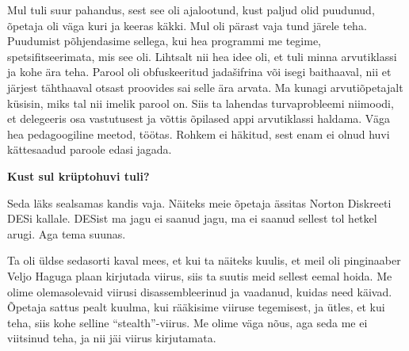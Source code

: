 Mul tuli suur pahandus, sest see oli ajalootund, kust
paljud olid puudunud, õpetaja oli väga kuri ja keeras käkki. Mul oli
pärast vaja tund järele teha. Puudumist põhjendasime sellega, kui 
hea programmi me tegime, spetsifitseerimata, mis see oli. Lihtsalt nii hea idee oli, et
tuli minna arvutiklassi ja kohe ära teha. Parool oli obfuskeeritud
jadašifrina või isegi baithaaval, nii et järjest tähthaaval otsast proovides
sai selle ära arvata. Ma kunagi arvutiõpetajalt küsisin, miks
tal nii imelik parool on. Siis ta lahendas turvaprobleemi niimoodi, et
delegeeris osa vastutusest ja võttis õpilased appi arvutiklassi
haldama. Väga hea pedagoogiline meetod, töötas. Rohkem ei häkitud, sest enam ei olnud 
huvi kättesaadud paroole edasi jagada.

\textbf{Kust sul krüptohuvi tuli?}

Seda läks sealsamas kandis vaja. Näiteks meie õpetaja ässitas Norton
Diskreeti
DESi kallale. DESist
ma jagu ei saanud jagu, ma ei saanud sellest tol hetkel arugi. Aga tema suunas. 

Ta oli üldse sedasorti kaval mees, et kui ta näiteks kuulis, et meil oli
pinginaaber Veljo Haguga plaan kirjutada viirus,
siis ta suutis meid sellest eemal hoida. Me olime olemasolevaid viirusi
disassembleerinud ja vaadanud, kuidas need käivad. Õpetaja sattus pealt kuulma,
kui rääkisime viiruse tegemisest, ja ütles, et kui teha, siis kohe
selline \enquote{stealth}-viirus. Me olime väga nõus, aga seda me ei viitsinud
teha, ja nii jäi viirus kirjutamata.

